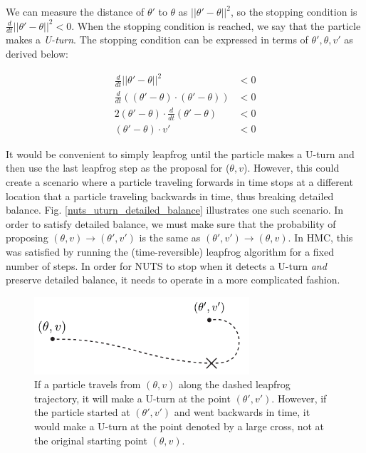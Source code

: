 \documentclass[12pt]{article}
\begin{document}
We can measure the distance of $\theta'$ to $\theta$ as $||\theta'-\theta||^2$, so the stopping condition is $\frac{d}{dt} ||\theta'-\theta||^2 < 0$. When the stopping condition is reached, we say that the particle makes a \textit{U-turn}. The stopping condition can be expressed in terms of $\theta', \theta, v'$ as derived below:

\begin{align}
\frac{d}{dt} ||\theta'-\theta||^2 &< 0 \\
\frac{d}{dt} \left((\theta'-\theta) \cdot (\theta'-\theta) \right) &< 0 \\
2(\theta'-\theta) \cdot \frac{d}{dt}(\theta'-\theta) &< 0 \\
(\theta'-\theta) \cdot v' &< 0
\end{align}
\label{eq_uturn}

It would be convenient to simply leapfrog until the particle makes a U-turn and then use the last leapfrog step as the proposal for ($\theta, v$). However, this could create a scenario where a particle traveling forwards in time stops at a different location that a particle traveling backwards in time, thus breaking detailed balance. Fig. \ref{nuts_uturn_detailed_balance} illustrates one such scenario. In order to satisfy detailed balance, we must make sure that the probability of proposing $(\theta, v) \rightarrow (\theta', v')$ is the same as $(\theta', v') \rightarrow (\theta, v)$. In HMC, this was satisfied by running the (time-reversible) leapfrog algorithm for a fixed number of steps. In order for NUTS to stop when it detects a U-turn \textit{and} preserve detailed balance, it needs to operate in a more complicated fashion.

\begin{figure}[h]
\centering
\includegraphics[width=8cm]{illustrations/nuts_uturn_detailed_balance.pdf}
\caption{If a particle travels from $(\theta, v)$ along the dashed leapfrog trajectory, it will make a U-turn at the point $(\theta', v')$. However, if the particle started at $(\theta', v')$ and went backwards in time, it would make a U-turn at the point denoted by a large cross, not at the original starting point $(\theta, v)$.}
\label{fig_nuts_uturn_detailed_balance}
\end{figure}
\end{document}
